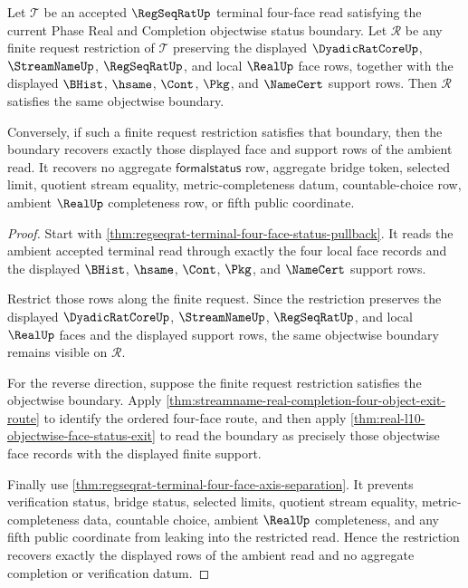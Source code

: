 \begin{theorem}
\label{thm:regseqrat-terminal-four-face-finite-request-restriction}
Let $\mathcal T$ be an accepted $\RegSeqRatUp$ terminal four-face read satisfying the current Phase Real and Completion objectwise status boundary. Let $\mathcal R$ be any finite request restriction of $\mathcal T$ preserving the displayed $\DyadicRatCoreUp$, $\StreamNameUp$, $\RegSeqRatUp$, and local $\RealUp$ face rows, together with the displayed $\BHist$, $\hsame$, $\Cont$, $\Pkg$, and $\NameCert$ support rows. Then $\mathcal R$ satisfies the same objectwise boundary.

Conversely, if such a finite request restriction satisfies that boundary, then the boundary recovers exactly those displayed face and support rows of the ambient read. It recovers no aggregate $\mathsf{formalstatus}$ row, aggregate bridge token, selected limit, quotient stream equality, metric-completeness datum, countable-choice row, ambient $\RealUp$ completeness row, or fifth public coordinate.
\end{theorem}
\begin{proof}
Start with \autoref{thm:regseqrat-terminal-four-face-status-pullback}. It reads the ambient accepted terminal read through exactly the four local face records and the displayed $\BHist$, $\hsame$, $\Cont$, $\Pkg$, and $\NameCert$ support rows.

Restrict those rows along the finite request. Since the restriction preserves the displayed $\DyadicRatCoreUp$, $\StreamNameUp$, $\RegSeqRatUp$, and local $\RealUp$ faces and the displayed support rows, the same objectwise boundary remains visible on $\mathcal R$.

For the reverse direction, suppose the finite request restriction satisfies the objectwise boundary. Apply \autoref{thm:streamname-real-completion-four-object-exit-route} to identify the ordered four-face route, and then apply \autoref{thm:real-l10-objectwise-face-status-exit} to read the boundary as precisely those objectwise face records with the displayed finite support.

Finally use \autoref{thm:regseqrat-terminal-four-face-axis-separation}. It prevents verification status, bridge status, selected limits, quotient stream equality, metric-completeness data, countable choice, ambient $\RealUp$ completeness, and any fifth public coordinate from leaking into the restricted read. Hence the restriction recovers exactly the displayed rows of the ambient read and no aggregate completion or verification datum.
\end{proof}
